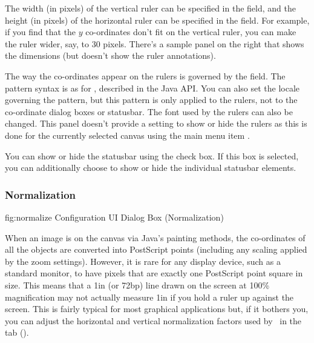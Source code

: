 The width (in pixels) of the vertical ruler can be specified in the
 field, and the height (in pixels) of
the horizontal ruler can be specified in the
 field. For example, if you find that
the $y$ co-ordinates don't fit on the vertical ruler, you can make the
ruler wider, say, to 30 pixels. There's a sample panel on the right
that shows the dimensions (but doesn't show the ruler annotations).

The way the co-ordinates appear on the rulers is governed by the
 field.  The pattern syntax is as for
\href{https://docs.oracle.com/javase/8/docs/api/java/text/DecimalFormat.html}{},
described in the Java API.  You can also set the locale governing
the pattern, but this pattern is only applied to the \glspl{ruler},
not to the co-ordinate dialog boxes or \gls{statusbar}. The font
used by the rulers can also be changed.  This panel doesn't provide
a setting to show or hide the rulers as this is done for the
currently selected \gls{canvas} using the main menu item
.

You can show or hide the \gls{statusbar} using the
 check box. If this box is
selected, you can additionally choose to show or hide the
individual \gls{statusbar} elements.


\subsubsection{Normalization}\label{sec:normalize}


\FloatFig
  {fig:normalize}
  {}
  {Configuration UI Dialog Box (Normalization)}

When an image is  on the \gls{canvas} via Java's painting
methods, the co-ordinates of all the objects are converted into
PostScript points (including any scaling applied by the zoom
settings). However, it is rare for any display device, such as a
standard monitor, to have pixels that are exactly one PostScript point square
in size. This means that a 1in (or 72\gls{bp}) line drawn on the
screen at 100\% magnification may not actually measure 1in if you
hold a ruler up against the screen. This is fairly typical for
most graphical applications but, if it bothers you, you can
adjust the horizontal and vertical normalization factors used by
\FlowframTk\ in the  tab
().

